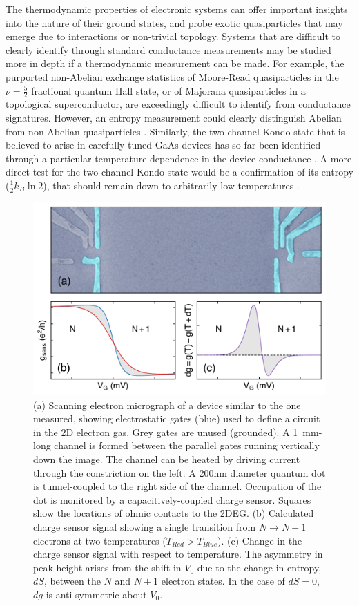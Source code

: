 \documentclass[twocolumn,showpacs,preprintnumbers,amsmath,amssymb,pra,aps,superscriptaddress]{revtex4-1}
\begin{document}
The thermodynamic properties of electronic systems can offer important insights into the nature of their ground states, and probe exotic quasiparticles that may emerge due to interactions or non-trivial topology.  Systems that are difficult to clearly identify through standard conductance measurements may be studied more in depth if a thermodynamic measurement can be made. For example, the purported non-Abelian exchange statistics of Moore-Read quasiparticles in the $\nu = \frac{5}{2}$ fractional quantum Hall state, or of Majorana quasiparticles in a topological superconductor, are exceedingly difficult to identify from conductance signatures. However, an entropy measurement could clearly distinguish Abelian from non-Abelian quasiparticles \cite{Cooper2009, Smirnov2015}.  Similarly, the two-channel Kondo state that is believed to arise in carefully tuned GaAs devices has so far been identified through a particular temperature dependence in the device conductance \cite{Potok2007}. A more direct test for the two-channel Kondo state would be a confirmation of its entropy ($\frac{1}{2} k_B \ln{2}$), that should remain down to arbitrarily low temperatures \cite{Alkurtass2016}.

\begin{figure}[!]
        \includegraphics[width=1.0\columnwidth]{../figures/figure_1_no-annotation.pdf}
        \caption{\label{fig:fig1}(a) Scanning electron micrograph of a device similar to the one measured, showing electrostatic gates (blue) used to define a circuit in the 2D electron gas. Grey gates are unused (grounded).  A \SI{1}{\milli\metre}-long channel is formed between the parallel gates running vertically down the image. The channel can be heated by driving current through the constriction on the left.  A 200nm diameter quantum dot is tunnel-coupled to the right side of the channel. Occupation of the dot is monitored by a capacitively-coupled charge sensor. Squares show the locations of ohmic contacts to the 2DEG. (b) Calculated charge sensor signal showing a single transition from $N \rightarrow N+1$ electrons at two temperatures ($T_{Red} > T_{Blue}$). (c) Change in the charge sensor signal with respect to temperature. The asymmetry in peak height arises from the shift in $V_0$ due to the change in entropy, $dS$, between the $N$ and $N+1$ electron states. In the case of $dS=0$, $dg$ is anti-symmetric about $V_0$.}
\end{figure}
\end{document}
